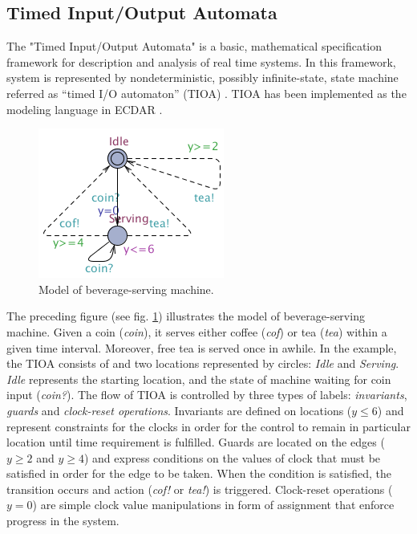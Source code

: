 


\subsection{Timed Input/Output Automata \label{background-tioa}}
%
The "Timed Input/Output Automata" is a basic, mathematical specification framework for description and analysis of real time systems. 
In this framework, system is represented by nondeterministic, possibly infinite-state, state machine referred 
as “timed I/O automaton” (TIOA) \cite{Kaynar:2006:TTI:1203437}. TIOA has been implemented as the modeling language in ECDAR \cite{conf/atva/DavidLLNW10}.

\begin{figure}[t]
\label{simple-model}
\begin{centering}
\includegraphics[scale=0.7]{images/bev_machine_model}
\par\end{centering}
\caption{Model of beverage-serving machine.}
\label{bev-machine}
\end{figure}

The preceding figure (see fig. \ref{bev-machine}) illustrates the model of beverage-serving machine. Given a coin (\emph{coin}), it serves either coffee (\emph{cof}) 
or tea (\emph{tea}) within a given time interval. Moreover, free tea is served once in awhile. In the example, the TIOA consists of and two locations represented by 
circles: \emph{Idle} and \emph{Serving}. \emph{Idle} represents the starting location, and the state of machine waiting for coin input (\emph{coin?}).  
 The flow of TIOA is controlled by three types of labels: \emph{invariants}, \emph{guards} and \emph{clock-reset operations}. 
Invariants are defined on locations ($y\leq 6$) and represent constraints for the clocks in order for the control to remain in particular location until time requirement is fulfilled.  
Guards are located on the edges ($y\geq 2$ and $y\geq 4$) and express conditions on the values of clock that must be satisfied in order for 
the edge to be taken. When the condition is satisfied, the transition occurs and action (\emph{cof!} or \emph{tea!}) is triggered. Clock-reset operations ($y=0$) are simple
clock value manipulations in form of assignment that enforce progress in the system.

